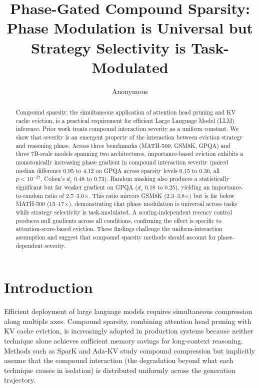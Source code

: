 \documentclass[11pt,a4paper]{article}
\title{Phase-Gated Compound Sparsity: Phase Modulation is Universal but Strategy Selectivity is Task-Modulated}
\author{Anonymous}
\date{}
\begin{document}
\maketitle

\begin{abstract}
Compound sparsity, the simultaneous application of attention head pruning and KV cache eviction, is a practical requirement for efficient Large Language Model (LLM) inference. Prior work treats compound interaction severity as a uniform constant. We show that severity is an emergent property of the interaction between eviction strategy and reasoning phase. Across three benchmarks (MATH-500, GSM8K, GPQA) and three 7B-scale models spanning two architectures, importance-based eviction exhibits a monotonically increasing phase gradient in compound interaction severity (paired median difference 0.95 to 4.12 on GPQA across sparsity levels 0.15 to 0.30, all $p < 10^{-27}$, Cohen's $d_z$ 0.48 to 0.73). Random masking also produces a statistically significant but far weaker gradient on GPQA ($d_z$ 0.18 to 0.25), yielding an importance-to-random ratio of 2.7--3.0$\times$. This ratio mirrors GSM8K (2.3--3.8$\times$) but is far below MATH-500 (15--17$\times$), demonstrating that phase modulation is universal across tasks while strategy selectivity is task-modulated. A scoring-independent recency control produces null gradients across all conditions, confirming the effect is specific to attention-score-based eviction. These findings challenge the uniform-interaction assumption and suggest that compound sparsity methods should account for phase-dependent severity.
\end{abstract}

\section{Introduction}

Efficient deployment of large language models requires simultaneous compression along multiple axes. Compound sparsity, combining attention head pruning with KV cache eviction, is increasingly adopted in production systems because neither technique alone achieves sufficient memory savings for long-context reasoning. Methods such as SparK and Ada-KV study compound compression but implicitly assume that the compound interaction (the degradation beyond what each technique causes in isolation) is distributed uniformly across the generation trajectory.
\end{document}

